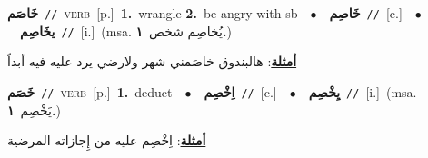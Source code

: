 \documentclass[10pt,a4paper,twoside]{article} %
\begin{document}
\begin{multicols}{2}
{\setlength\topsep{0pt}\textbf{\foreignlanguage{arabic}{خَاصَم}}\ {\color{gray}\texttt{//}\color{black}}\ \textsc{verb}\ [p.]\ \textbf{1.}~wrangle  \textbf{2.}~be angry with sb\ \ $\bullet$\ \ \setlength\topsep{0pt}\textbf{\foreignlanguage{arabic}{خَاصِم}}\ {\color{gray}\texttt{//}\color{black}}\ [c.]\ \ $\bullet$\ \ \setlength\topsep{0pt}\textbf{\foreignlanguage{arabic}{يخَاصِم}}\ {\color{gray}\texttt{//}\color{black}}\ [i.]\ \color{gray}(msa. \foreignlanguage{arabic}{يُخاصِم شخص}~\foreignlanguage{arabic}{\textbf{١.}})\color{black}\  \begin{flushright}\color{gray}\foreignlanguage{arabic}{\textbf{\underline{\foreignlanguage{arabic}{أمثلة}}}: هالبندوق خاصَمني شهر ولارضي يرد عليه فيه أبداً}\end{flushright}\color{black}} \vspace{2mm}

{\setlength\topsep{0pt}\textbf{\foreignlanguage{arabic}{خَصَم}}\ {\color{gray}\texttt{//}\color{black}}\ \textsc{verb}\ [p.]\ \textbf{1.}~deduct\ \ $\bullet$\ \ \setlength\topsep{0pt}\textbf{\foreignlanguage{arabic}{اِخْصِم}}\ {\color{gray}\texttt{//}\color{black}}\ [c.]\ \ $\bullet$\ \ \setlength\topsep{0pt}\textbf{\foreignlanguage{arabic}{يِخْصِم}}\ {\color{gray}\texttt{//}\color{black}}\ [i.]\ \color{gray}(msa. \foreignlanguage{arabic}{يَخْصِم}~\foreignlanguage{arabic}{\textbf{١.}})\color{black}\  \begin{flushright}\color{gray}\foreignlanguage{arabic}{\textbf{\underline{\foreignlanguage{arabic}{أمثلة}}}: اِخْصِم عليه من إِجازاته المرضية}\end{flushright}\color{black}} \vspace{2mm}


\end{multicols}
\end{document}
